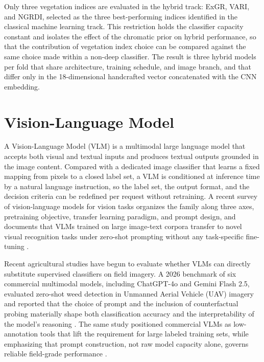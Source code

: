 Only three vegetation indices are evaluated in the hybrid track: ExGR, VARI, and NGRDI, selected as the three best-performing indices identified in the classical machine learning track. This restriction holds the classifier capacity constant and isolates the effect of the chromatic prior on hybrid performance, so that the contribution of vegetation index choice can be compared against the same choice made within a non-deep classifier. The result is three hybrid models per fold that share architecture, training schedule, and image branch, and that differ only in the 18-dimensional handcrafted vector concatenated with the CNN embedding.

\section{Vision-Language Model}

A Vision-Language Model (VLM) is a multimodal large language model that accepts both visual and textual inputs and produces textual outputs grounded in the image content. Compared with a dedicated image classifier that learns a fixed mapping from pixels to a closed label set, a VLM is conditioned at inference time by a natural language instruction, so the label set, the output format, and the decision criteria can be redefined per request without retraining. A recent survey of vision-language models for vision tasks organizes the family along three axes, pretraining objective, transfer learning paradigm, and prompt design, and documents that VLMs trained on large image-text corpora transfer to novel visual recognition tasks under zero-shot prompting without any task-specific fine-tuning \cite{zhang2024vlmsurvey}.

Recent agricultural studies have begun to evaluate whether VLMs can directly substitute supervised classifiers on field imagery. A 2026 benchmark of six commercial multimodal models, including ChatGPT-4o and Gemini Flash 2.5, evaluated zero-shot weed detection in Unmanned Aerial Vehicle (UAV) imagery and reported that the choice of prompt and the inclusion of counterfactual probing materially shape both classification accuracy and the interpretability of the model's reasoning \cite{frontiers2026weedvlm}. The same study positioned commercial VLMs as low-annotation tools that lift the requirement for large labeled training sets, while emphasizing that prompt construction, not raw model capacity alone, governs reliable field-grade performance \cite{frontiers2026weedvlm}.

